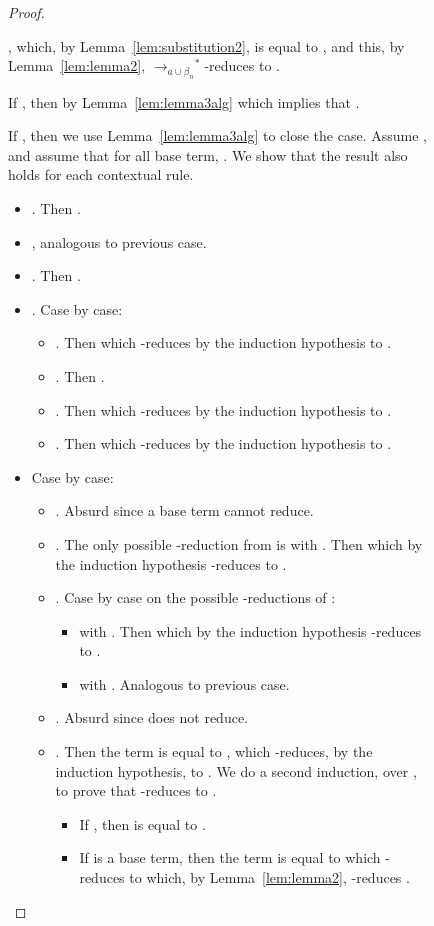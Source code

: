 \documentclass{LMCS}
\newcommand{\xto}[1]{\ensuremath{\rightarrow_{#1}}}
\newcommand{\stobalgred}{\ensuremath{\xto{a\cup\beta_n}^{\ast}}}
\begin{document}
\begin{figure}
{\begin{proof}
\begin{description}
      ,
      which, by Lemma~\ref{lem:substitution2}, is equal to
      , and this, by Lemma~\ref{lem:lemma2},
      \stobalgred-reduces to
      .
    \item[Algebraic rules] If , then by Lemma~\ref{lem:lemma3alg}  which implies that .
    \item[Rules  and ] If , then we use Lemma~\ref{lem:lemma3alg} to close the case. 
      Assume , and assume that for all  base term, . We show that the result also holds for each contextual rule.
      \begin{itemize}
	\item . Then .
	\item , analogous to previous case.
	\item . Then .
	\item . Case by case:
	  \begin{itemize}
	    \item .  Then  which -reduces by the induction hypothesis to .
	    \item . Then .
	    \item . Then   which -reduces by the induction hypothesis to .
	    \item . Then   which -reduces by the induction hypothesis to .
	  \end{itemize}
	\item  Case by case:
	  \begin{itemize}
	    \item . Absurd since a base term cannot reduce.
	    \item . The only possible -reduction from  is  with . Then  which by the induction hypothesis -reduces to .
	    \item . Case by case on the possible -reductions of :
	      \begin{itemize}
		\item  with . Then  which by the induction hypothesis -reduces to .
		\item  with . Analogous to previous case.
	      \end{itemize}
	    \item . Absurd since  does not reduce.
	    \item . Then the term  is equal to , which -reduces, by the induction hypothesis, to .
	      We do a second induction, over , to prove that  -reduces to .
	      \begin{itemize} 
		\item If , then  is equal to .
		\item If  is a base term, then the term  is equal to  which -reduces to   which, by Lemma~\ref{lem:lemma2}, -reduces .

\end{itemize}
\end{itemize}
\end{itemize}
\end{description}
\end{proof}}
\end{figure}
\end{document}
